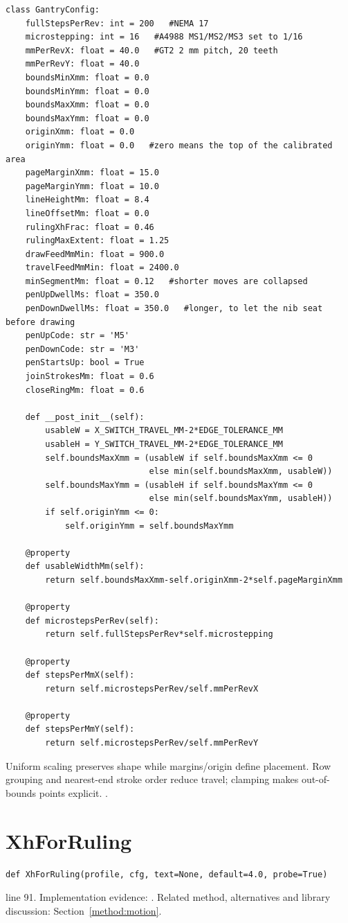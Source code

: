 \begin{lstlisting}[style=plain]
class GantryConfig:
    fullStepsPerRev: int = 200   #NEMA 17
    microstepping: int = 16   #A4988 MS1/MS2/MS3 set to 1/16
    mmPerRevX: float = 40.0   #GT2 2 mm pitch, 20 teeth
    mmPerRevY: float = 40.0
    boundsMinXmm: float = 0.0
    boundsMinYmm: float = 0.0
    boundsMaxXmm: float = 0.0
    boundsMaxYmm: float = 0.0
    originXmm: float = 0.0
    originYmm: float = 0.0   #zero means the top of the calibrated area
    pageMarginXmm: float = 15.0
    pageMarginYmm: float = 10.0
    lineHeightMm: float = 8.4
    lineOffsetMm: float = 0.0
    rulingXhFrac: float = 0.46
    rulingMaxExtent: float = 1.25
    drawFeedMmMin: float = 900.0
    travelFeedMmMin: float = 2400.0
    minSegmentMm: float = 0.12   #shorter moves are collapsed
    penUpDwellMs: float = 350.0
    penDownDwellMs: float = 350.0   #longer, to let the nib seat before drawing
    penUpCode: str = 'M5'
    penDownCode: str = 'M3'
    penStartsUp: bool = True
    joinStrokesMm: float = 0.6
    closeRingMm: float = 0.6

    def __post_init__(self):
        usableW = X_SWITCH_TRAVEL_MM-2*EDGE_TOLERANCE_MM
        usableH = Y_SWITCH_TRAVEL_MM-2*EDGE_TOLERANCE_MM
        self.boundsMaxXmm = (usableW if self.boundsMaxXmm <= 0
                             else min(self.boundsMaxXmm, usableW))
        self.boundsMaxYmm = (usableH if self.boundsMaxYmm <= 0
                             else min(self.boundsMaxYmm, usableH))
        if self.originYmm <= 0:
            self.originYmm = self.boundsMaxYmm

    @property
    def usableWidthMm(self):
        return self.boundsMaxXmm-self.originXmm-2*self.pageMarginXmm

    @property
    def microstepsPerRev(self):
        return self.fullStepsPerRev*self.microstepping

    @property
    def stepsPerMmX(self):
        return self.microstepsPerRev/self.mmPerRevX

    @property
    def stepsPerMmY(self):
        return self.microstepsPerRev/self.mmPerRevY
\end{lstlisting}
Uniform scaling preserves shape while margins/origin define placement. Row grouping and nearest-end stroke order reduce travel; clamping makes out-of-bounds points explicit. \cite{bresenham1965,code2026}.


\section{XhForRuling}\label{fn:reproduce:XhForRuling}
\begin{lstlisting}[style=sig]
def XhForRuling(profile, cfg, text=None, default=4.0, probe=True)
\end{lstlisting}
 line 91. Implementation evidence: \cite{code2026}. Related method, alternatives and library discussion: Section~\ref{method:motion}.


